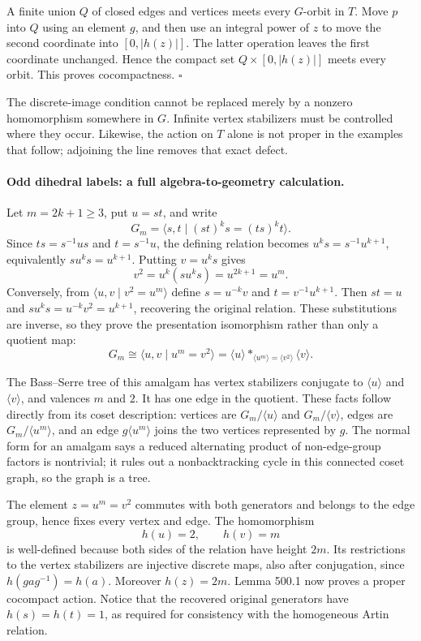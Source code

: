 \documentclass[11pt]{article}
\begin{document}
A finite union $Q$ of closed edges and vertices meets every $G$-orbit in
$T$. Move $p$ into $Q$ using an element $g$, and then use an integral power
of $z$ to move the second coordinate into $[0,|h(z)|]$. The latter operation
leaves the first coordinate unchanged. Hence the compact set
$Q\times[0,|h(z)|]$ meets every orbit. This proves cocompactness.
\hfill$\square$

The discrete-image condition cannot be replaced merely by a nonzero
homomorphism somewhere in $G$. Infinite vertex stabilizers must be controlled
where they occur. Likewise, the action on $T$ alone is not proper in the
examples that follow; adjoining the line removes that exact defect.

\paragraph{Odd dihedral labels: a full algebra-to-geometry calculation.}
Let $m=2k+1\ge3$, put $u=st$, and write
\[
 G_m=\langle s,t\mid (st)^ks=(ts)^kt\rangle.
\]
Since $ts=s^{-1}us$ and $t=s^{-1}u$, the defining relation becomes
$u^ks=s^{-1}u^{k+1}$, equivalently $su^ks=u^{k+1}$.
Putting $v=u^ks$ gives
\[
 v^2=u^k(su^ks)=u^{2k+1}=u^m.
\]
Conversely, from $\langle u,v\mid v^2=u^m\rangle$ define
$s=u^{-k}v$ and $t=v^{-1}u^{k+1}$. Then $st=u$ and
$su^ks=u^{-k}v^2=u^{k+1}$, recovering the original relation.
These substitutions are inverse, so they prove the presentation isomorphism
rather than only a quotient map:
\begin{equation}\label{ra500:odd}
 G_m\cong\langle u,v\mid u^m=v^2\rangle
       =\langle u\rangle*_{\langle u^m\rangle=\langle v^2\rangle}
        \langle v\rangle.
\end{equation}

The Bass--Serre tree of this amalgam has vertex stabilizers conjugate to
$\langle u\rangle$ and $\langle v\rangle$, and valences $m$ and $2$.
It has one edge in the quotient. These facts follow directly from its coset
description: vertices are $G_m/\langle u\rangle$ and
$G_m/\langle v\rangle$, edges are $G_m/\langle u^m\rangle$, and an edge
$g\langle u^m\rangle$ joins the two vertices represented by $g$.
The normal form for an amalgam says a reduced alternating product of
non-edge-group factors is nontrivial; it rules out a nonbacktracking cycle
in this connected coset graph, so the graph is a tree.

The element $z=u^m=v^2$ commutes with both generators and belongs to the
edge group, hence fixes every vertex and edge. The homomorphism
\[
 h(u)=2,\qquad h(v)=m
\]
is well-defined because both sides of the relation have height $2m$.
Its restrictions to the vertex stabilizers are injective discrete maps,
also after conjugation, since $h(gag^{-1})=h(a)$. Moreover $h(z)=2m$.
Lemma 500.1 now proves a proper cocompact action. Notice that the recovered
original generators have $h(s)=h(t)=1$, as required for consistency with
the homogeneous Artin relation.
\end{document}
